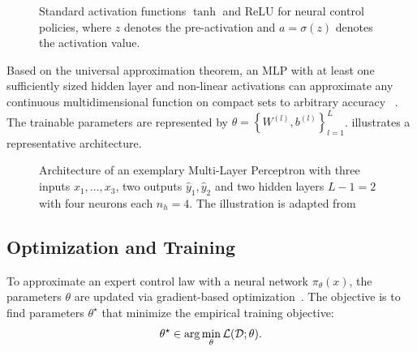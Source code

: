 \begin{figure}[htbp]
    \centering
    
    \caption[Activation functions]{Standard activation functions $\tanh$ and ReLU for neural control policies, 
        where $z$ denotes the pre-activation and $a = \sigma(z)$ denotes the activation value.}
    \label{fig:activation-funs}
\end{figure}

Based on the universal approximation theorem, an MLP with at least one sufficiently sized hidden layer and non-linear activations 
can approximate any continuous multidimensional function on compact sets to arbitrary accuracy~
. 
The trainable parameters are represented by $\theta = \left\{W^{(l)}, b^{(l)}\right\}_{l=1}^L$.  
illustrates a representative architecture.

\begin{figure}[htbp]
    \centering
    
    \caption[MLP Architecture]{
        Architecture of an exemplary Multi-Layer Perceptron with three inputs $x_1, \dots, x_3$, two outputs $\hat{y}_1, \hat{y}_2$ and 
        two hidden layers $L-1 = 2$ with four neurons each $n_h = 4$. 
        The illustration is adapted from~
    }
    \label{fig:mlp-architecture}
\end{figure}



\subsection{Optimization and Training}
\label{subsec:opt-training}

To approximate an expert control law with a neural network $\pi_\theta(x)$, the parameters $\theta$ are updated 
via gradient-based optimization~. 
The objective is to find parameters $\theta^\star$ that minimize the empirical
training objective:
\begin{equation}
    \label{eq:training-objective}
    \theta^\star \in \arg\min_{\theta} \mathcal{L}(\mathcal{D}; \theta).
\end{equation}


